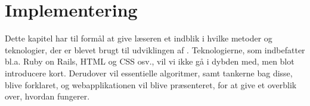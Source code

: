 \chapter{Implementering}
\label{chap:implementering}

Dette kapitel har til formål at give læseren et indblik i hvilke metoder og teknologier, der er blevet brugt til udviklingen af \Foodl. Teknologierne, som indbefatter bl.a. Ruby on Rails, HTML og CSS osv., vil vi ikke gå i dybden med, men blot introducere kort. Derudover vil essentielle algoritmer, samt tankerne bag disse, blive forklaret, og webapplikationen vil blive præsenteret, for at give et overblik over, hvordan {\Foodl} fungerer. 






